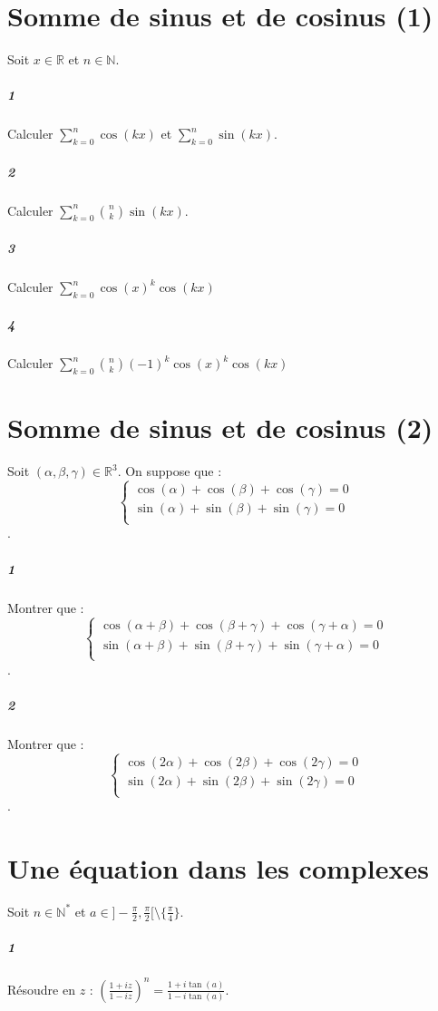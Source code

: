 \documentclass[10pt,a4paper]{article}
\begin{document}
\section{Somme de sinus et de cosinus (1)}
Soit $x \in \mathbb{R}$ et $n \in \mathbb{N}$.
\subparagraph{1}Calculer $\sum_{k=0}^n \cos(kx)$ et $\sum_{k=0}^n \sin(kx)$.
\subparagraph{2}Calculer $\sum_{k=0}^n {n \choose k}  \sin(kx)$.
\subparagraph{3}Calculer $\sum_{k=0}^n \cos(x)^k  \cos(kx)$
\subparagraph{4}Calculer $\sum_{k=0}^n {n \choose k} (-1)^k \cos(x)^k  \cos(kx)$

\section{Somme de sinus et de cosinus (2)}
Soit $(\alpha,\beta,\gamma) \in \mathbb{R}^3$. On suppose que :
\begin{equation*}
\left\{
\begin{aligned}
\cos(\alpha)+\cos(\beta)+\cos(\gamma)=0\\
\sin(\alpha)+\sin(\beta)+\sin(\gamma)=0\\
\end{aligned}
\right.
\end{equation*}.
\subparagraph{1}Montrer que :
\begin{equation*}
\left\{
\begin{aligned}
\cos(\alpha+\beta)+\cos(\beta+\gamma)+\cos(\gamma+\alpha)=0\\
\sin(\alpha+\beta)+\sin(\beta+\gamma)+\sin(\gamma+\alpha)=0\\
\end{aligned}
\right.
\end{equation*}.
\subparagraph{2}Montrer que :
\begin{equation*}
\left\{
\begin{aligned}
\cos(2\alpha)+\cos(2\beta)+\cos(2\gamma)=0\\
\sin(2\alpha)+\sin(2\beta)+\sin(2\gamma)=0\\
\end{aligned}
\right.
\end{equation*}.

\section{Une équation dans les complexes}
Soit $n \in \mathbb{N}^*$ et $a \in ]-\frac{\pi}{2},\frac{\pi}{2}[ \setminus \{ \frac{\pi}{4}\}$.
\subparagraph{1}Résoudre en $z$ : $\left(\frac{1+iz}{1-iz}\right)^n=\frac{1+i\tan(a)}{1-i\tan(a)}$.
\end{document}

